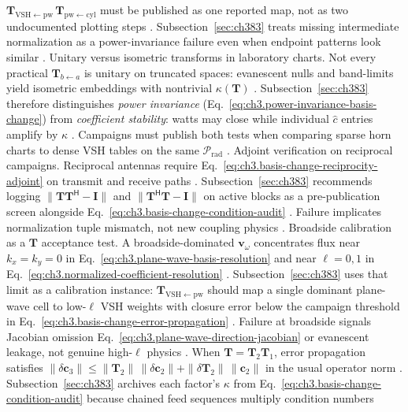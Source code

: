 \(\mathbf{T}_{\mathrm{VSH}\leftarrow\mathrm{pw}}\,\mathbf{T}_{\mathrm{pw}\leftarrow\mathrm{cyl}}\) must be published as one reported map, not as two undocumented plotting steps
\cite{harrington2001}. Subsection~\ref{sec:ch383} treats missing intermediate normalization as a power-invariance failure even when endpoint patterns look similar
\cite{poynting1884}.
Unitary versus isometric transforms in laboratory charts. Not every practical \(\mathbf{T}_{b\leftarrow a}\) is unitary on truncated spaces: evanescent nulls and band-limits yield isometric embeddings with nontrivial \(\kappa(\mathbf{T})\)
\cite{kato1995}. Subsection~\ref{sec:ch383} therefore distinguishes \emph{power invariance} (Eq.~\eqref{eq:ch3.power-invariance-basis-change}) from \emph{coefficient stability}: watts may close while individual \(\widehat{c}\) entries amplify by \(\kappa\)
\cite{devaney2004}. Campaigns must publish both tests when comparing sparse horn charts to dense VSH tables on the same \(\mathcal{P}_{\mathrm{rad}}\)
\cite{harrington2001}.
Adjoint verification on reciprocal campaigns. Reciprocal antennas require Eq.~\eqref{eq:ch3.basis-change-reciprocity-adjoint} on transmit and receive paths \cite{stratton1941}. Subsection~\ref{sec:ch383} recommends logging \(\|\mathbf{T}\mathbf{T}^{\mathsf{H}}-\mathbf{I}\|\) and \(\|\mathbf{T}^{\mathsf{H}}\mathbf{T}-\mathbf{I}\|\) on active blocks as a pre-publication screen alongside Eq.~\eqref{eq:ch3.basis-change-condition-audit}
\cite{hansen1988}. Failure implicates normalization tuple mismatch, not new coupling physics
\cite{harrington2001}.
Broadside calibration as a $\mathbf{T}$ acceptance test. A broadside-dominated \(\mathbf{v}_\omega\) concentrates flux near \(k_{x}=k_{y}=0\) in Eq.~\eqref{eq:ch3.plane-wave-basis-resolution} and near \(\ell=0,1\) in Eq.~\eqref{eq:ch3.normalized-coefficient-resolution}
\cite{jackson1999}. Subsection~\ref{sec:ch383} uses that limit as a calibration instance: \(\mathbf{T}_{\mathrm{VSH}\leftarrow\mathrm{pw}}\) should map a single dominant plane-wave cell to low-\(\ell\) VSH weights with closure error below the campaign threshold in Eq.~\eqref{eq:ch3.basis-change-error-propagation}
\cite{stratton1941}. Failure at broadside signals Jacobian omission Eq.~\eqref{eq:ch3.plane-wave-direction-jacobian} or evanescent leakage, not genuine high-\(\ell\) physics
\cite{harrington2001}.
When \(\mathbf{T}=\mathbf{T}_{2}\mathbf{T}_{1}\), error propagation satisfies \(\|\delta\mathbf{c}_{3}\|\le\|\mathbf{T}_{2}\|\,\|\delta\mathbf{c}_{2}\|+\|\delta\mathbf{T}_{2}\|\,\|\mathbf{c}_{2}\|\) in the usual operator norm \cite{kato1995}. Subsection~\ref{sec:ch383} archives each factor's \(\kappa\) from Eq.~\eqref{eq:ch3.basis-change-condition-audit} because chained feed sequences multiply condition numbers
